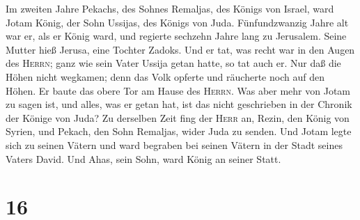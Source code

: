  Im zweiten Jahre Pekachs, des Sohnes Remaljas, des
Königs von Israel, ward Jotam König, der Sohn Ussijas, des Königs von
Juda.  Fünfundzwanzig Jahre alt war er, als er König
ward, und regierte sechzehn Jahre lang zu Jerusalem. Seine Mutter hieß
Jerusa, eine Tochter Zadoks.  Und er tat, was recht war
in den Augen des \textsc{Herrn}; ganz wie sein Vater Ussija getan hatte,
so tat auch er.  Nur daß die Höhen nicht wegkamen; denn
das Volk opferte und räucherte noch auf den Höhen. Er baute das obere
Tor am Hause des \textsc{Herrn}.  Was aber mehr von Jotam
zu sagen ist, und alles, was er getan hat, ist das nicht geschrieben in
der Chronik der Könige von Juda?  Zu derselben Zeit fing
der \textsc{Herr} an, Rezin, den König von Syrien, und Pekach, den Sohn
Remaljas, wider Juda zu senden.  Und Jotam legte sich zu
seinen Vätern und ward begraben bei seinen Vätern in der Stadt seines
Vaters David. Und Ahas, sein Sohn, ward König an seiner Statt.

\hypertarget{section-15}{%
\section{16}\label{section-15}}

